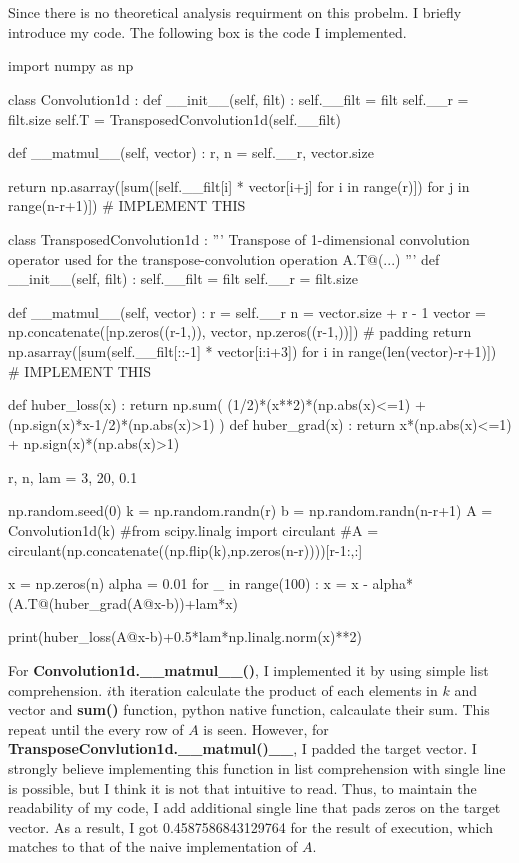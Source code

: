 \documentclass[10pt]{article}
\begin{document}
\section{}
Since there is no theoretical analysis requirment on this probelm. I briefly introduce my code. The following box is the code I implemented. 

\begin{python}
    import numpy as np

    class Convolution1d :
        def __init__(self, filt) :
            self.__filt = filt
            self.__r = filt.size
            self.T = TransposedConvolution1d(self.__filt)

        def __matmul__(self, vector) :
            r, n = self.__r, vector.size
            
            return np.asarray([sum([self.__filt[i] * vector[i+j] for i in range(r)]) for j in range(n-r+1)])  # IMPLEMENT THIS
        
    class TransposedConvolution1d :
        '''
        Transpose of 1-dimensional convolution operator used for the 
        transpose-convolution operation A.T@(...)
        '''
        def __init__(self, filt) :
            self.__filt = filt
            self.__r = filt.size

        def __matmul__(self, vector) :
            r = self.__r
            n = vector.size + r - 1
            vector = np.concatenate([np.zeros((r-1,)), vector, np.zeros((r-1,))]) # padding
            return  np.asarray([sum(self.__filt[::-1] * vector[i:i+3]) for i in range(len(vector)-r+1)]) # IMPLEMENT THIS

    def huber_loss(x) :
        return np.sum( (1/2)*(x**2)*(np.abs(x)<=1) + (np.sign(x)*x-1/2)*(np.abs(x)>1) )
    def huber_grad(x) :
        return x*(np.abs(x)<=1) + np.sign(x)*(np.abs(x)>1)


    r, n, lam = 3, 20, 0.1

    np.random.seed(0)
    k = np.random.randn(r)
    b = np.random.randn(n-r+1)
    A = Convolution1d(k)
    #from scipy.linalg import circulant
    #A = circulant(np.concatenate((np.flip(k),np.zeros(n-r))))[r-1:,:]


    x = np.zeros(n)
    alpha = 0.01
    for _ in range(100) :
        x = x - alpha*(A.T@(huber_grad(A@x-b))+lam*x)

    print(huber_loss(A@x-b)+0.5*lam*np.linalg.norm(x)**2)
\end{python}

For \textbf{Convolution1d.\_\_matmul\_\_()}, I implemented it by using simple list comprehension. $i$th iteration calculate the product of each elements in $k$ and vector and \textbf{sum()} function, python native function, calcaulate their sum.
This repeat until the every row of $A$ is seen. However, for \textbf{TransposeConvlution1d.\_\_matmul()\_\_}, I padded the target vector. I strongly believe implementing this function in list comprehension with single line is possible, but 
I think it is not that intuitive to read. Thus, to maintain the readability of my code, I add additional single line that pads zeros on the target vector. 
As a result, I got 0.4587586843129764 for the result of execution, which matches to that of the naive implementation of $A$.


\end{document}
